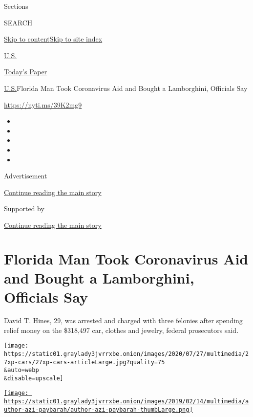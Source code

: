 Sections

SEARCH

\protect\hyperlink{site-content}{Skip to
content}\protect\hyperlink{site-index}{Skip to site index}

\href{https://www.nytimes3xbfgragh.onion/section/us}{U.S.}

\href{https://myaccount.nytimes3xbfgragh.onion/auth/login?response_type=cookie\&client_id=vi}{}

\href{https://www.nytimes3xbfgragh.onion/section/todayspaper}{Today's
Paper}

\href{/section/us}{U.S.}\textbar{}Florida Man Took Coronavirus Aid and
Bought a Lamborghini, Officials Say

\url{https://nyti.ms/39K2mg9}

\begin{itemize}
\item
\item
\item
\item
\item
\end{itemize}

Advertisement

\protect\hyperlink{after-top}{Continue reading the main story}

Supported by

\protect\hyperlink{after-sponsor}{Continue reading the main story}

\hypertarget{florida-man-took-coronavirus-aid-and-bought-a-lamborghini-officials-say}{%
\section{Florida Man Took Coronavirus Aid and Bought a Lamborghini,
Officials
Say}\label{florida-man-took-coronavirus-aid-and-bought-a-lamborghini-officials-say}}

David T. Hines, 29, was arrested and charged with three felonies after
spending relief money on the \$318,497 car, clothes and jewelry, federal
prosecutors said.

\texttt{[image: https://static01.graylady3jvrrxbe.onion/images/2020/07/27/multimedia/27xp-cars/27xp-cars-articleLarge.jpg?quality=75\\\&auto=webp\\\&disable=upscale]}

\href{https://www.nytimes3xbfgragh.onion/by/azi-paybarah}{\texttt{[image: https://static01.graylady3jvrrxbe.onion/images/2019/02/14/multimedia/author-azi-paybarah/author-azi-paybarah-thumbLarge.png]}}

